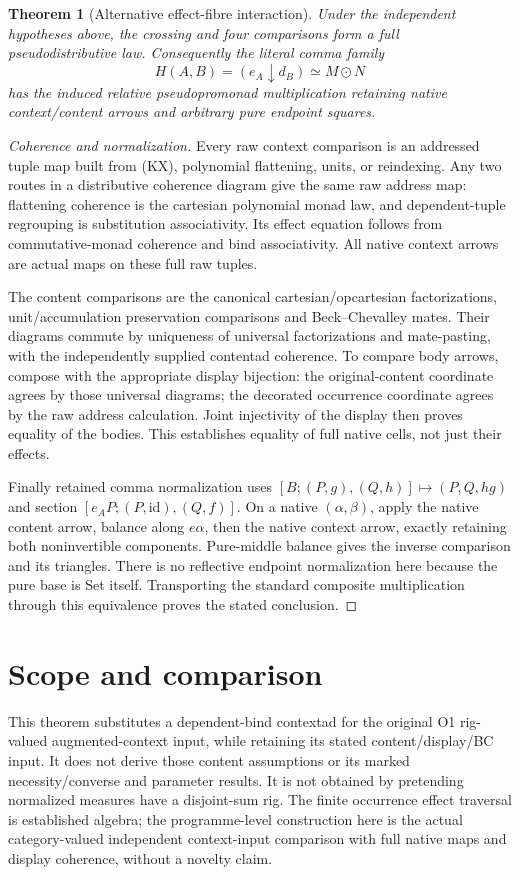 \documentclass[11pt]{article}
\newtheorem{theorem}{Theorem}\newtheorem{proposition}{Proposition}
\begin{document}
\begin{theorem}[Alternative effect-fibre interaction]
Under the independent hypotheses above, the crossing and four comparisons form a full pseudodistributive law. Consequently the literal comma family
\[
 H(A,B)=(e_A\downarrow d_B)\simeq M\odot N
\]
has the induced relative pseudopromonad multiplication retaining native context/content arrows and arbitrary pure endpoint squares.
\end{theorem}
\begin{proof}[Coherence and normalization]
Every raw context comparison is an addressed tuple map built from (KX), polynomial flattening, units, or reindexing. Any two routes in a distributive coherence diagram give the same raw address map: flattening coherence is the cartesian polynomial monad law, and dependent-tuple regrouping is substitution associativity. Its effect equation follows from commutative-monad coherence and bind associativity. All native context arrows are actual maps on these full raw tuples.

The content comparisons are the canonical cartesian/opcartesian factorizations, unit/accumulation preservation comparisons and Beck--Chevalley mates. Their diagrams commute by uniqueness of universal factorizations and mate-pasting, with the independently supplied contentad coherence. To compare body arrows, compose with the appropriate display bijection: the original-content coordinate agrees by those universal diagrams; the decorated occurrence coordinate agrees by the raw address calculation. Joint injectivity of the display then proves equality of the bodies. This establishes equality of full native cells, not just their effects.

Finally retained comma normalization uses $[B;(P,g),(Q,h)]\mapsto(P,Q,hg)$ and section $[e_AP;(P,\mathrm{id}),(Q,f)]$. On a native $(\alpha,\beta)$, apply the native content arrow, balance along $e\alpha$, then the native context arrow, exactly retaining both noninvertible components. Pure-middle balance gives the inverse comparison and its triangles. There is no reflective endpoint normalization here because the pure base is Set itself. Transporting the standard composite multiplication through this equivalence proves the stated conclusion.
\end{proof}

\section{Scope and comparison}
This theorem substitutes a dependent-bind contextad for the original O1 rig-valued augmented-context input, while retaining its stated content/display/BC input. It does not derive those content assumptions or its marked necessity/converse and parameter results. It is not obtained by pretending normalized measures have a disjoint-sum rig. The finite occurrence effect traversal is established algebra; the programme-level construction here is the actual category-valued independent context-input comparison with full native maps and display coherence, without a novelty claim.
\end{document}

